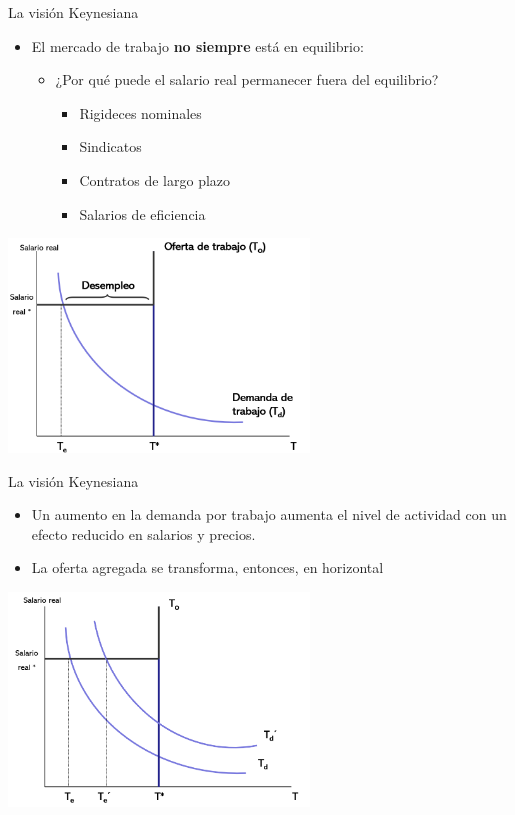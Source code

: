\documentclass{beamer}
\begin{document}
\begin{frame}{La visión Keynesiana}
\begin{itemize}
    \footnotesize\item El mercado de trabajo \textbf{no siempre} está en equilibrio:
    \vspace{2mm}
    \begin{itemize}
    \scriptsize\item ¿Por qué puede el salario real permanecer fuera del equilibrio?
    \begin{itemize}
        \scriptsize\item Rigideces nominales
        \scriptsize\item Sindicatos
        \scriptsize\item Contratos de largo plazo
        \scriptsize\item Salarios de eficiencia
       \end{itemize}
    \end{itemize}
\end{itemize}
    \centering\includegraphics[width=8cm]{Figures/P30.png}\
\end{frame}


\begin{frame}{La visión Keynesiana}
\begin{itemize}
\item Un aumento en la demanda por trabajo aumenta el nivel de actividad con un efecto reducido en salarios y precios.
\item La oferta agregada se transforma, entonces, en horizontal
\end{itemize}
    \centering\includegraphics[width=8cm]{Figures/P31.png}\
\end{frame}
\end{document}
